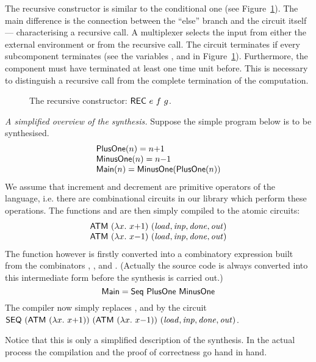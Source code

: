 \documentclass{llncs}
\begin{document}
The recursive constructor is similar to the conditional one
(see Figure~\ref{figRec}).
The main difference is the connection between the
``else'' branch and the circuit itself --- characterising a
recursive call. A multiplexer selects the input from either
the external environment or from the recursive call.
The circuit terminates if every subcomponent terminates
(see the variables ,  and 
in Figure~\ref{figRec}). Furthermore, the component 
must have terminated at least one time unit before. This is
necessary to distinguish a recursive call from the
complete termination of the computation.

\begin{figure}[htb]
   \centerline{}
   \caption{\label{figRec}The recursive constructor: $\DEF{REC}\ e\ f\ g$.}
\end{figure}

\begin{example} {\em A simplified overview of the synthesis.\/}
Suppose the simple program below is to be synthesised.
\[ 
\begin{array}{l}
   \mathsf{PlusOne}(n) = n{+}1 \\
   \mathsf{MinusOne}(n) = n{-}1 \\
   \mathsf{Main}(n) = \mathsf{MinusOne}(\mathsf{PlusOne}(n))
\end{array} 
\]
We assume that increment and decrement are
primitive operators of the language, i.e. 
there are combinational circuits in our
library which perform these operations.
The functions  and  
are then simply compiled to the atomic circuits:
\[
\begin{array}{l}
\mathsf{ATM}\ (\lambda x.\ x{+}1)\ (\mathit{load,inp,done,out}) \\
\mathsf{ATM}\ (\lambda x.\ x{-}1)\ (\mathit{load,inp,done,out}) \\
\end{array}
\]
The function  however is firstly
converted into a combinatory expression
built from the combinators , 
,  and .
(Actually the source code is always
converted into this intermediate form
before the synthesis is carried out.)
\[
\mathsf{Main} = \mathsf{Seq}\ \mathsf{PlusOne}\ \mathsf{MinusOne}
\]
The compiler now simply replaces ,
 and  by the circuit
$\DEF{SEQ}\ (\DEF{ATM}\ (\lambda x.\ x{+}1))\ 
            (\DEF{ATM}\ (\lambda x.\ x{-}1))\ (\VAR{load,inp,done,out})$.

Notice that this is only a simplified description
of the synthesis. In the actual process
the compilation and the proof of correctness 
go hand in hand.
\end{example}
\end{document}
